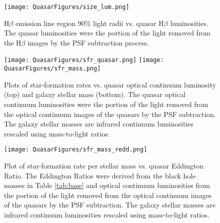 \begin{figure}%
\begin{center}
 \texttt{[image: QuasarFigures/size\_lum.png]}
  \caption{
    H$\beta$ emission line region 90\% light radii vs. quasar H$\beta$ luminosities. The quasar luminosities were the portion of the light removed from the H$\beta$ images by the PSF subtraction process.}
\label{fig:sizelum}
\end{center}
\end{figure}

\begin{figure}%
\begin{center}
 \texttt{[image: QuasarFigures/sfr\_quasar.png]}
 \texttt{[image: QuasarFigures/sfr\_mass.png]}
  \caption{Plots of star-formation rates vs. quasar optical continuum luminosity (top) and galaxy stellar mass (bottom).  The quasar optical continuum luminosities were the portion of the light removed from the optical continuum images of the quasars by the PSF subtraction.  The galaxy stellar masses are infrared continuum luminosities rescaled using mass-to-light ratios.}
\label{fig:sfr}
\end{center}
\end{figure}

\begin{figure}%
\begin{center}
 \texttt{[image: QuasarFigures/sfr\_mass\_redd.png]}
  \caption{Plot of star-formation rate per stellar mass vs. quasar Eddington Ratio.  The Eddington Ratios were derived from the black hole masses in Table \ref{tab:base} and optical continuum luminosities from the portion of the light removed from the optical continuum images of the quasars by the PSF subtraction.  The galaxy stellar masses are infrared continuum luminosities rescaled using mass-to-light ratios.}
\label{fig:sfredd}
\end{center}
\end{figure}

